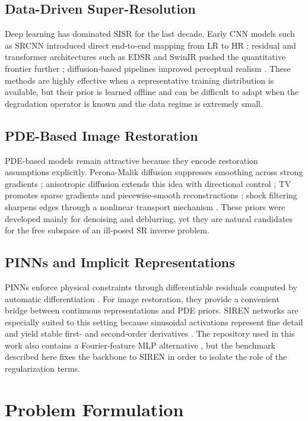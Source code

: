 \documentclass[conference]{IEEEtran}
\begin{document}
\subsection{Data-Driven Super-Resolution}
Deep learning has dominated SISR for the last decade. Early CNN models
such as SRCNN introduced direct end-to-end mapping from LR to HR
\cite{dong2014srcnn}; residual and transformer architectures such as
EDSR and SwinIR pushed the quantitative frontier further
\cite{lim2017edsr,liang2021swinir}; diffusion-based pipelines improved
perceptual realism \cite{saharia2022sr3}. These methods are highly
effective when a representative training distribution is available, but
their prior is learned offline and can be difficult to adapt when the
degradation operator is known and the data regime is extremely small.

\subsection{PDE-Based Image Restoration}
PDE-based models remain attractive because they encode restoration
assumptions explicitly. Perona-Malik diffusion suppresses smoothing
across strong gradients \cite{peronamalik1990}; anisotropic diffusion
extends this idea with directional control \cite{weickert1998}; TV
promotes sparse gradients and piecewise-smooth reconstructions
\cite{rof1992}; shock filtering sharpens edges through a nonlinear
transport mechanism \cite{osherrudin1990}. These priors were developed
mainly for denoising and deblurring, yet they are natural candidates
for the free subspace of an ill-posed SR inverse problem.

\subsection{PINNs and Implicit Representations}
PINNs enforce physical constraints through differentiable residuals
computed by automatic differentiation \cite{raissi2019pinn}. For image
restoration, they provide a convenient bridge between continuous
representations and PDE priors. SIREN networks are especially suited
to this setting because sinusoidal activations represent fine detail
and yield stable first- and second-order derivatives
\cite{sitzmann2020siren}. The repository used in this work also
contains a Fourier-feature MLP alternative \cite{tancik2020fourier},
but the benchmark described here fixes the backbone to SIREN in order
to isolate the role of the regularization terms.

\section{Problem Formulation}
\end{document}
